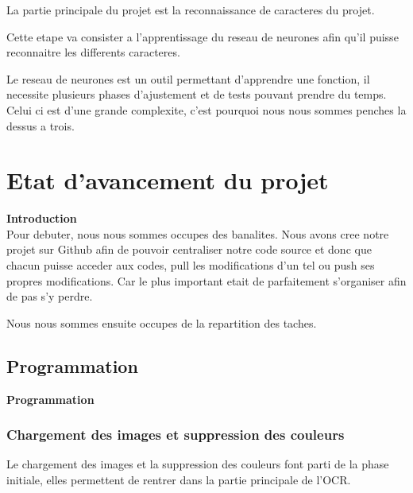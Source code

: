 \documentclass[a4paper, 12pt]{report}
\begin{document}
	\Large
	
	La partie principale du projet est la reconnaissance de caracteres du projet.\newline
	
	Cette etape va consister a l'apprentissage du reseau de neurones afin qu'il puisse reconnaitre les differents caracteres. \newline
	
	
	
	Le reseau de neurones est un outil permettant d'apprendre une fonction, il necessite plusieurs phases d'ajustement et de tests pouvant prendre du temps. Celui ci est d'une grande complexite, c'est pourquoi nous nous sommes penches la dessus a trois. \\


\part{Etat d'avancement du projet}

	\huge {\bfseries Introduction } \\

	Pour debuter, nous nous sommes occupes des banalites. Nous avons cree notre projet sur Github afin de pouvoir centraliser notre code source et donc que chacun puisse acceder aux codes, pull les modifications d'un tel ou push ses propres modifications. Car le plus important etait de parfaitement s'organiser afin de pas s'y perdre. \newline
	
	
	Nous nous sommes ensuite occupes de la repartition des taches. \newline
	
\chapter{Programmation} 

\newpage

\huge {\bfseries Programmation } \\
	
	\section{Chargement des images et suppression des couleurs}
	
	\Large
	
	Le chargement des images et la suppression des couleurs font parti de la phase initiale, elles permettent de rentrer dans la partie principale de l'OCR. \newline
	
\end{document}
